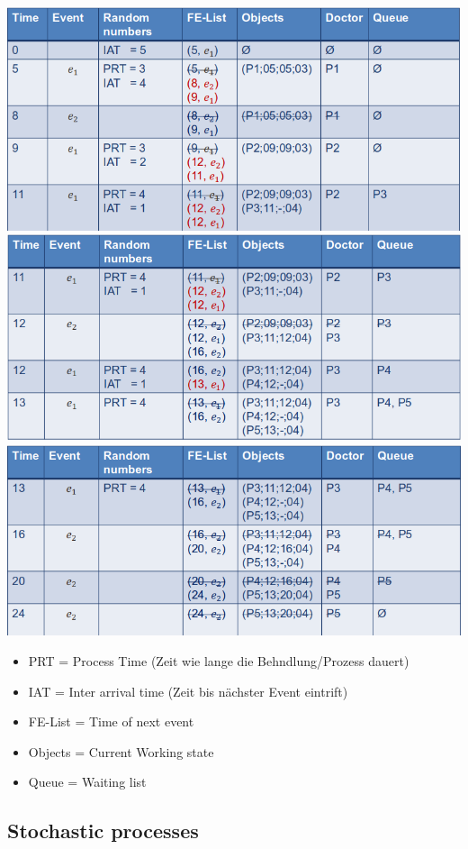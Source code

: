 \includegraphics{figures/DEMech1.png}
\includegraphics{figures/DEMech2.png}
\includegraphics{figures/DEMech3.png}

\begin{itemize}
\tightlist
\item
  PRT = Process Time (Zeit wie lange die Behndlung/Prozess dauert)
\item
  IAT = Inter arrival time (Zeit bis nächster Event eintrift)
\item
  FE-List = Time of next event
\item
  Objects = Current Working state
\item
  Queue = Waiting list
\end{itemize}

\hypertarget{stochastic-processes}{%
\subsection{Stochastic processes}\label{stochastic-processes}}

